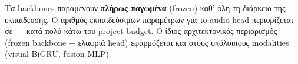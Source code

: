 Τα backbones παραμένουν \textbf{πλήρως παγωμένα} (frozen) καθ' όλη τη
διάρκεια της εκπαίδευσης.
Ο αριθμός εκπαιδεύσιμων παραμέτρων για το audio head περιορίζεται
σε  — κατά πολύ κάτω του project budget.
Ο ίδιος αρχιτεκτονικός περιορισμός (frozen backbone + ελαφριά head)
εφαρμόζεται και στους υπόλοιπους modalities (visual BiGRU, fusion MLP).
